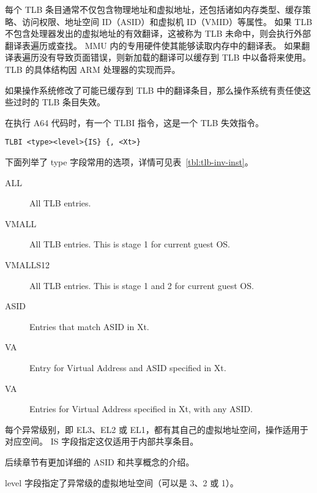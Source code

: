 每个 TLB 条目通常不仅包含物理地址和虚拟地址，还包括诸如内存类型、缓存策略、访问权限、地址空间 ID（ASID）和虚拟机 ID（VMID）等属性。
如果 TLB 不包含处理器发出的虚拟地址的有效翻译，这被称为 TLB 未命中，则会执行外部翻译表遍历或查找。
MMU 内的专用硬件使其能够读取内存中的翻译表。
如果翻译表遍历没有导致页面错误，则新加载的翻译可以缓存到 TLB 中以备将来使用。
TLB 的具体结构因 ARM 处理器的实现而异。

如果操作系统修改了可能已缓存到 TLB 中的翻译条目，那么操作系统有责任使这些过时的 TLB 条目失效。

在执行 A64 代码时，有一个 TLBI 指令，这是一个 TLB 失效指令。

\lstinline!TLBI <type><level>{IS} {, <Xt>}!

下面列举了 type 字段常用的选项，详情可见表~\ref{tbl:tlb-inv-inst}。

\begin{description}
  \item[ALL] All TLB entries.
  \item[VMALL] All TLB entries. This is stage 1 for current guest OS.
  \item[VMALLS12] All TLB entries. This is stage 1 and 2 for current guest OS.
  \item[ASID] Entries that match ASID in Xt.
  \item[VA] Entry for Virtual Address and ASID specified in Xt.
  \item[VA] Entries for Virtual Address specified in Xt, with any ASID.
\end{description}

每个异常级别，即 EL3、EL2 或 EL1，都有其自己的虚拟地址空间，操作适用于对应空间。
IS 字段指定这仅适用于内部共享条目。

\begin{Tcbox}[title={Note}]
  后续章节有更加详细的 ASID 和共享概念的介绍。
\end{Tcbox}

level 字段指定了异常级的虚拟地址空间（可以是 3、2 或 1）。

